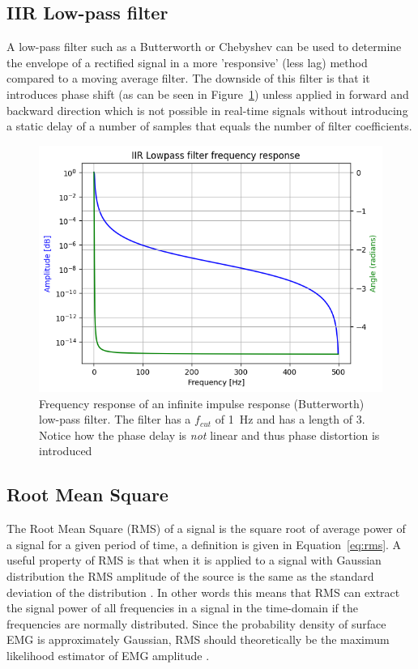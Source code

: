 \subsection{IIR Low-pass filter}
A low-pass filter such as a Butterworth or Chebyshev can be used to determine the envelope of a rectified signal in a more 'responsive' (less lag) method compared to a moving average filter. The downside of this filter is that it introduces phase shift (as can be seen in Figure~\ref{fig:iirfilter_phaseshift}) unless applied in forward and backward direction \cite{rose2011electromyogram} which is not possible in real-time signals without introducing a static delay of a number of samples that equals the number of filter coefficients.

\begin{figure}[h!t]
	\begin{center}
		\includegraphics[width=0.7\columnwidth]{images/iirfilter_phaseshift.png}
	\end{center}
	\caption{Frequency response of an infinite impulse response (Butterworth) low-pass filter. The filter has a $f_{cut}$ of \SI{1}{Hz} and has a length of 3. Notice how the phase delay is \textit{not} linear and thus phase distortion is introduced}
	\label{fig:iirfilter_phaseshift}
\end{figure}

\subsection{Root Mean Square}
The Root Mean Square (RMS) of a signal is the square root of average power of a signal for a given period of time, a definition is given in Equation~\ref{eq:rms}. A useful property of RMS is that when it is applied to a signal with Gaussian distribution the RMS amplitude of the source is the same as the standard deviation of the distribution \cite{rms_standard_deviation}. In other words this means that RMS can extract the signal power of all frequencies in a signal in the time-domain if the frequencies are normally distributed. Since the probability density of surface EMG is approximately Gaussian, RMS should theoretically be the maximum likelihood estimator of EMG amplitude \cite{semg_signals_analysis_and_applications}.


